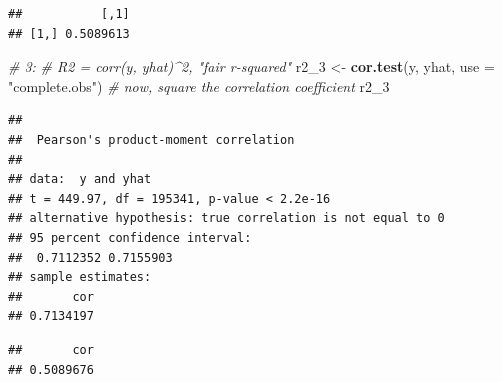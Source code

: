 \documentclass[
]{article}
\newenvironment{Shaded}{\begin{snugshade}}{\end{snugshade}}
\newcommand{\CommentTok}[1]{\textcolor[rgb]{0.56,0.35,0.01}{\textit{#1}}}
\newcommand{\DataTypeTok}[1]{\textcolor[rgb]{0.13,0.29,0.53}{#1}}
\newcommand{\DecValTok}[1]{\textcolor[rgb]{0.00,0.00,0.81}{#1}}
\newcommand{\KeywordTok}[1]{\textcolor[rgb]{0.13,0.29,0.53}{\textbf{#1}}}
\newcommand{\NormalTok}[1]{#1}
\newcommand{\OperatorTok}[1]{\textcolor[rgb]{0.81,0.36,0.00}{\textbf{#1}}}
\newcommand{\StringTok}[1]{\textcolor[rgb]{0.31,0.60,0.02}{#1}}
\begin{document}
\begin{Shaded}
\end{Shaded}

\begin{verbatim}
##           [,1]
## [1,] 0.5089613
\end{verbatim}

\begin{Shaded}
\begin{Highlighting}[]
\CommentTok{# 3:}
\CommentTok{# R2 = corr(y, yhat)^2, "fair r-squared"}
\NormalTok{r2_}\DecValTok{3}\NormalTok{ <-}\StringTok{ }\KeywordTok{cor.test}\NormalTok{(y, yhat, }\DataTypeTok{use =} \StringTok{"complete.obs"}\NormalTok{)}
\CommentTok{# now, square the correlation coefficient}
\NormalTok{r2_}\DecValTok{3}
\end{Highlighting}
\end{Shaded}

\begin{verbatim}
## 
##  Pearson's product-moment correlation
## 
## data:  y and yhat
## t = 449.97, df = 195341, p-value < 2.2e-16
## alternative hypothesis: true correlation is not equal to 0
## 95 percent confidence interval:
##  0.7112352 0.7155903
## sample estimates:
##       cor 
## 0.7134197
\end{verbatim}

\begin{Shaded}
\end{Shaded}

\begin{verbatim}
##       cor 
## 0.5089676
\end{verbatim}
\end{document}
